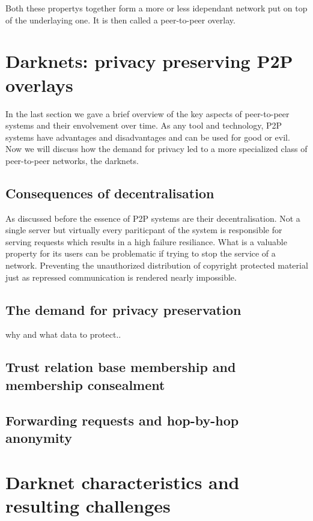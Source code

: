 Both these propertys together form a more or less idependant network put on top of the underlaying one. It is then called a peer-to-peer overlay.


\section{Darknets: privacy preserving P2P overlays}

In the last section we gave a brief overview of the key aspects of peer-to-peer systems and their envolvement over time. As any tool and technology, P2P systems have advantages and disadvantages and can be used for good or evil. Now we will discuss how the demand for privacy led to a more specialized class of peer-to-peer networks, the darknets.

\subsection{Consequences of decentralisation}

As discussed before the essence of P2P systems are their decentralisation. Not a single server but virtually every pariticpant of the system is responsible for serving requests which results in a high failure resiliance. What is a valuable property for its users can be problematic if trying to stop the service of a network. Preventing the unauthorized distribution of copyright protected material just as repressed communication is rendered nearly impossible. 

\subsection{The demand for privacy preservation}
why and what data to protect..

\subsection{Trust relation base membership and membership consealment}

\subsection{Forwarding requests and hop-by-hop anonymity}


\section{Darknet characteristics and resulting challenges}

